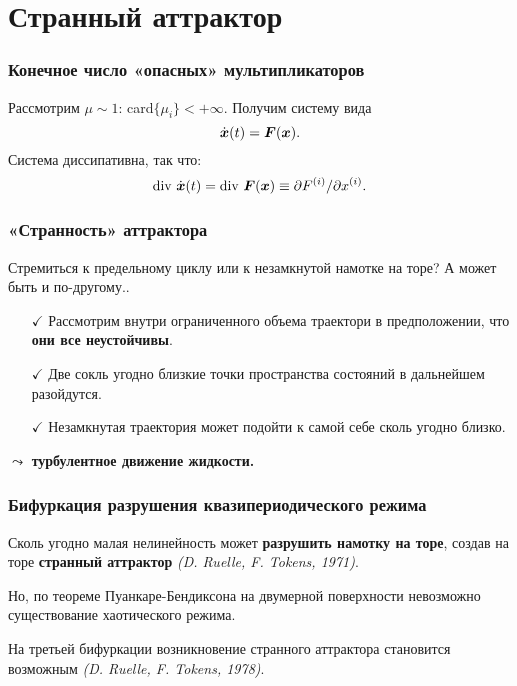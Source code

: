\section{Странный аттрактор}

\begin{frame}
\frametitle{Конечное число «опасных» мультипликаторов}

Рассмотрим $\mu \sim 1$: card$\{\mu_i\} < + \infty$. Получим систему вида
$$
    \dot{\mbox{\boldmath $x$}}(t) = \mbox{\boldmath $F$}(\mbox{\boldmath $x$}).
$$
Система диссипативна, так что:
$$
    \text{div } \dot{\mbox{\boldmath $x$}}(t) = \text{div } \mbox{\boldmath $F$}(\mbox{\boldmath $x$}) \equiv \partial F^{(i)} / \partial x^{(i)}.
$$



\end{frame}
\begin{frame}
\frametitle{«Странность» аттрактора}
Стремиться к предельному циклу или к незамкнутой намотке на торе? А может быть и по-другому..

\begin{itemize}
    \item[$\checkmark$] Рассмотрим внутри ограниченного объема траектори в предположении, что \textbf{они все неустойчивы}. 
    \item[$\checkmark$] Две сокль угодно близкие точки пространства состояний в дальнейшем разойдутся. 
    \item[$\checkmark$] Незамкнутая траектория может подойти к самой себе
сколь угодно близко. 
\end{itemize}

$\leadsto$ \textbf{турбулентное движение жидкости.}


\end{frame}
\begin{frame}
\frametitle{Бифуркация разрушения квазипериодического режима}
    
Сколь угодно малая нелинейность может \textbf{разрушить намотку на торе}, создав на торе \textbf{странный аттрактор} \textit{(D. Ruelle, F. Tokens, 1971)}.

\phantom{42}

Но, по теореме Пуанкаре-Бендиксона  на двумерной поверхности
невозможно существование хаотического режима.

\phantom{42}

На третьей бифуркации возникновение странного аттрактора становится возможным \textit{(D. Ruelle, F. Tokens, 1978)}.
\end{frame}
